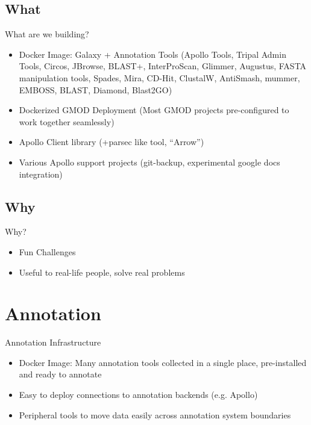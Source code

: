 \documentclass[12pt]{phage3slides} %
\begin{document}
\subsection{What}
\begin{frame}{What are we building?}
    \begin{itemize}
        \item Docker Image: Galaxy + Annotation Tools {\color{gray}(Apollo Tools, Tripal Admin Tools, Circos, JBrowse, BLAST+, InterProScan, Glimmer, Augustus, FASTA manipulation tools, Spades, Mira, CD-Hit, ClustalW, AntiSmash, mummer, EMBOSS, BLAST, Diamond, Blast2GO)}
        \item Dockerized GMOD Deployment {\color{gray}(Most GMOD projects pre-configured to work together seamlessly)}
        \item Apollo Client library {\color{gray}(+parsec like tool, ``Arrow'')}
        \item Various Apollo support projects {\color{gray}(git-backup, experimental google docs integration)}
    \end{itemize}
\end{frame}

\subsection{Why}
\begin{frame}{Why?}
    \begin{itemize}
        \item Fun Challenges
        \item Useful to real-life people, solve real problems
    \end{itemize}
\end{frame}





\section{Annotation}
\begin{frame}{Annotation Infrastructure}
    \begin{itemize}
        \item Docker Image: Many annotation tools collected in a single place, pre-installed and ready to annotate
        \item Easy to deploy connections to annotation backends (e.g. Apollo)
        \item Peripheral tools to move data easily across annotation system boundaries %
    \end{itemize}
\end{frame}
\end{document}
